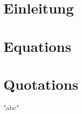 \documentclass{article}
\begin{document}
\pagestyle{scrheadings}
\clearpairofpagestyles
{}
\cfoot{\pagemark}

\section*{\centering Einleitung}

\tableofcontents
\clearpage

\section{Equations}

\section{Quotations}
"abc"



\end{document}
